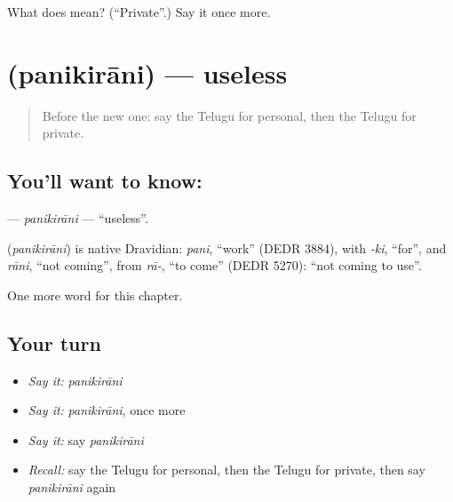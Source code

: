 \begin{tcolorbox}[breakable,colback=teal!4,colframe=teal!35!black,title={Before you move on}]
What does  mean? (\textquotedblleft{}Private\textquotedblright{}.) Say it once more.
\end{tcolorbox}
\section[\texorpdfstring{\te{పనికిరాని} (panikirāni)}{పనికిరాని (panikirāni)}]{ (panikirāni) — useless}

\label{lesson:TE-C223-panikirani}



\begin{quote}
Before the new one: say the Telugu for personal, then the Telugu for private.
\end{quote}

\subsection*{You'll want to know: }
\textbf{} — \emph{panikirāni} — \textquotedblleft{}useless\textquotedblright{}.

\begin{cousinweb}
\textbf{} (\emph{panikirāni}) is native Dravidian: \emph{pani}, \textquotedblleft{}work\textquotedblright{} (DEDR 3884), with \emph{-ki}, \textquotedblleft{}for\textquotedblright{}, and \emph{rāni}, \textquotedblleft{}not coming\textquotedblright{}, from \emph{rā-}, \textquotedblleft{}to come\textquotedblright{} (DEDR 5270): \textquotedblleft{}not coming to use\textquotedblright{}.
\end{cousinweb}

\begin{grammarlens}[title={What you've built}]
One more word for this chapter.
\end{grammarlens}

\subsection*{Your turn}
\begin{itemize}
\raggedright
  \item \emph{Say it:} \emph{panikirāni}
  \item \emph{Say it:} \emph{panikirāni}, once more
  \item \emph{Say it:} say \emph{panikirāni}
  \item \emph{Recall:} say the Telugu for personal, then the Telugu for private, then say \emph{panikirāni} again
\end{itemize}

